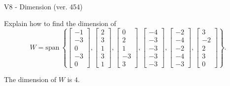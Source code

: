 \begin{exercise}
  \begin{exerciseTitle}V8 - Dimension (ver. 454)\end{exerciseTitle}
  \begin{exerciseStatement}
    Explain how to find the dimension of 
\[W=\mathrm{span}\ \left\{\left[\begin{array}{r}
-1 \\
-3 \\
0 \\
-3 \\
0
\end{array}\right] , \left[\begin{array}{r}
2 \\
3 \\
1 \\
3 \\
1
\end{array}\right] , \left[\begin{array}{r}
0 \\
2 \\
1 \\
-3 \\
3
\end{array}\right] , \left[\begin{array}{r}
-4 \\
-3 \\
-3 \\
-3 \\
-3
\end{array}\right] , \left[\begin{array}{r}
-2 \\
-4 \\
-2 \\
-4 \\
-3
\end{array}\right] , \left[\begin{array}{r}
3 \\
-2 \\
2 \\
3 \\
0
\end{array}\right]\right\}.\]



  \end{exerciseStatement}
  \begin{exerciseAnswer}
   The dimension of \(W\) is  \(4\).
  


  \end{exerciseAnswer}
\end{exercise}